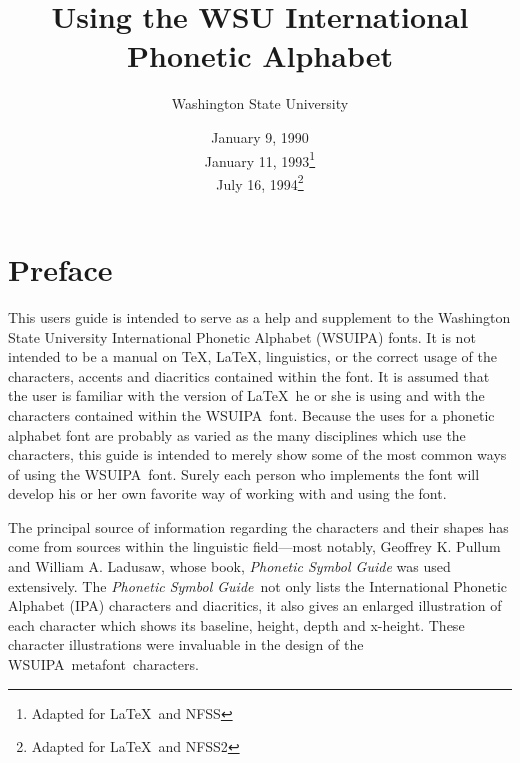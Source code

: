\newcommand{\B}[1]{$\backslash$#1}
\newcommand{\MF}{{\rm\sc{}metafont}}
\newcommand{\wsu}{{\small\rm WSUIPA}}
\newcommand{\ipam}{{\small\rm IPAMACS}}
\newcommand{\ipas}{{\small\rm IPA}}
\newcommand{\PL}{{\em Phonetic Symbol Guide}}


\title{Using the WSU International Phonetic Alphabet}
\author{Washington State University}
\date{
  January 9, 1990   \\
  January 11, 1993\footnote{Adapted for \LaTeX\ and NFSS} \\
  July 16, 1994\footnote{Adapted for \LaTeX\ and NFSS2}
}
\maketitle

\section{Preface}

This users guide is intended to serve as a help and supplement to the
Washington State University International Phonetic Alphabet (\wsu)
fonts. It is not intended to be a manual on \TeX, \LaTeX, linguistics,
or the correct usage of the characters, accents and diacritics
contained within the font. It is assumed that the user is familiar
with the version of \LaTeX\ he or she is using and with the characters
contained within the \wsu\ font. Because the uses for a phonetic
alphabet font are probably as varied as the many disciplines which use
the characters, this guide is intended to merely show some of the most
common ways of using the \wsu\ font. Surely each person who implements
the font will develop his or her own favorite way of working with and
using the font.

The principal source of information regarding the characters and their
shapes has come from sources within the linguistic field---most
notably, Geoffrey K. Pullum and William A. Ladusaw, whose book, {\em
Phonetic Symbol Guide} was used extensively. The \PL\ not only lists
the International Phonetic Alphabet (IPA) characters and diacritics,
it also gives an enlarged illustration of each character which shows
its baseline, height, depth and x-height. These character
illustrations were invaluable in the design of the \wsu\ \MF\
characters.


